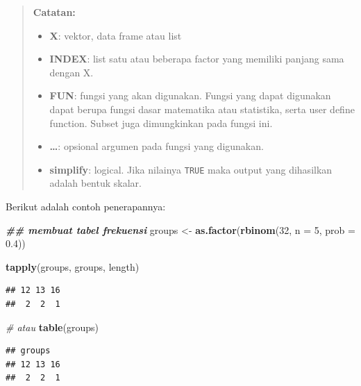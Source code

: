 \documentclass[
]{book}
\newenvironment{Shaded}{\begin{snugshade}}{\end{snugshade}}
\newcommand{\AttributeTok}[1]{\textcolor[rgb]{0.13,0.29,0.53}{#1}}
\newcommand{\CommentTok}[1]{\textcolor[rgb]{0.56,0.35,0.01}{\textit{#1}}}
\newcommand{\DecValTok}[1]{\textcolor[rgb]{0.00,0.00,0.81}{#1}}
\newcommand{\DocumentationTok}[1]{\textcolor[rgb]{0.56,0.35,0.01}{\textbf{\textit{#1}}}}
\newcommand{\FloatTok}[1]{\textcolor[rgb]{0.00,0.00,0.81}{#1}}
\newcommand{\FunctionTok}[1]{\textcolor[rgb]{0.13,0.29,0.53}{\textbf{#1}}}
\newcommand{\NormalTok}[1]{#1}
\newcommand{\OtherTok}[1]{\textcolor[rgb]{0.56,0.35,0.01}{#1}}
\newcommand{\SpecialCharTok}[1]{\textcolor[rgb]{0.81,0.36,0.00}{\textbf{#1}}}
\providecommand{\tightlist}{%
  \setlength{\itemsep}{0pt}\setlength{\parskip}{0pt}}
\theoremstyle{definition}
\theoremstyle{definition}
\theoremstyle{definition}
\theoremstyle{definition}
\theoremstyle{remark}
\begin{document}
\begin{quote}
\textbf{Catatan:}

\begin{itemize}
\tightlist
\item
  \textbf{X}: vektor, data frame atau list
\item
  \textbf{INDEX}: list satu atau beberapa factor yang memiliki panjang sama dengan X.
\item
  \textbf{FUN}: fungsi yang akan digunakan. Fungsi yang dapat digunakan dapat berupa fungsi dasar matematika atau statistika, serta user define function. Subset juga dimungkinkan pada fungsi ini.
\item
  \textbf{\ldots{}}: opsional argumen pada fungsi yang digunakan.
\item
  \textbf{simplify}: logical. Jika nilainya \texttt{TRUE} maka output yang dihasilkan adalah bentuk skalar.
\end{itemize}
\end{quote}

Berikut adalah contoh penerapannya:

\begin{Shaded}
\begin{Highlighting}[]
\DocumentationTok{\#\# membuat tabel frekuensi}
\NormalTok{groups }\OtherTok{\textless{}{-}} \FunctionTok{as.factor}\NormalTok{(}\FunctionTok{rbinom}\NormalTok{(}\DecValTok{32}\NormalTok{, }\AttributeTok{n =} \DecValTok{5}\NormalTok{, }\AttributeTok{prob =} \FloatTok{0.4}\NormalTok{))}

\FunctionTok{tapply}\NormalTok{(groups, groups, length)}
\end{Highlighting}
\end{Shaded}

\begin{verbatim}
## 12 13 16 
##  2  2  1
\end{verbatim}

\begin{Shaded}
\begin{Highlighting}[]
\CommentTok{\# atau}
\FunctionTok{table}\NormalTok{(groups)}
\end{Highlighting}
\end{Shaded}

\begin{verbatim}
## groups
## 12 13 16 
##  2  2  1
\end{verbatim}

\begin{Shaded}
\end{Shaded}
\end{document}
